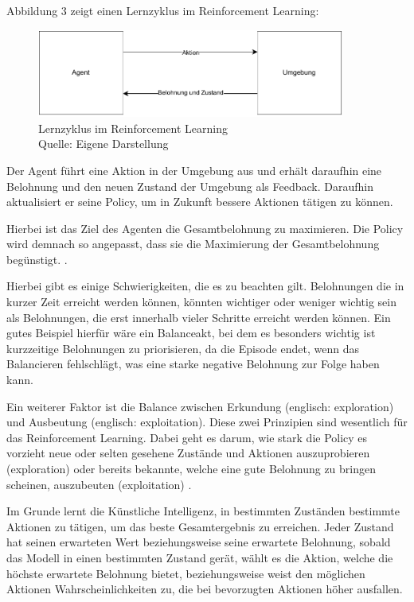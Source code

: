 \newpage
Abbildung 3 zeigt einen Lernzyklus im Reinforcement Learning:
\nopagebreak
\begin{figure}[H]
\centering
\includegraphics[width=0.9\textwidth]{Bilder/reinforcement.drawio} 
\caption[Lernzyklus im Reinforcement Learning]{Lernzyklus im Reinforcement Learning\\ Quelle: Eigene Darstellung}
\end{figure}

Der Agent führt eine Aktion in der Umgebung aus und erhält daraufhin eine Belohnung und den neuen Zustand der Umgebung als Feedback. Daraufhin aktualisiert er seine Policy, um in Zukunft bessere Aktionen tätigen zu können.

Hierbei ist das Ziel des Agenten die Gesamtbelohnung zu maximieren. Die Policy wird demnach so angepasst, dass sie die Maximierung der Gesamtbelohnung begünstigt. \cite[S. 12f]{ris-ala_fundamentals_2023}.

Hierbei gibt es einige Schwierigkeiten, die es zu beachten gilt. Belohnungen die in kurzer Zeit erreicht werden können, könnten wichtiger oder weniger wichtig sein als Belohnungen, die erst innerhalb vieler Schritte erreicht werden können. Ein gutes Beispiel hierfür wäre ein Balanceakt, bei dem es besonders wichtig ist kurzzeitige Belohnungen zu priorisieren, da die Episode endet, wenn das Balancieren fehlschlägt, was eine starke negative Belohnung zur Folge haben kann.

Ein weiterer Faktor ist die Balance zwischen Erkundung (englisch: exploration) und Ausbeutung (englisch: exploitation). Diese zwei Prinzipien sind wesentlich für das Reinforcement Learning. Dabei geht es darum, wie stark die Policy es vorzieht neue oder selten gesehene Zustände und Aktionen auszuprobieren (exploration) oder bereits bekannte, welche eine gute Belohnung zu bringen scheinen, auszubeuten (exploitation) \cite[S. 13]{ris-ala_fundamentals_2023}.

Im Grunde lernt die Künstliche Intelligenz, in bestimmten Zuständen bestimmte Aktionen zu tätigen, um das beste Gesamtergebnis zu erreichen. Jeder Zustand hat seinen erwarteten Wert beziehungsweise seine erwartete Belohnung, sobald das Modell in einen bestimmten Zustand gerät, wählt es die Aktion, welche die höchste erwartete Belohnung bietet, beziehungsweise weist den möglichen Aktionen Wahrscheinlichkeiten zu, die bei bevorzugten Aktionen höher ausfallen.\\

